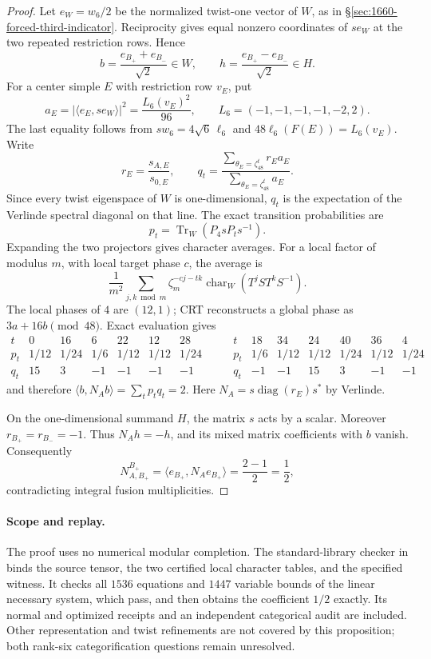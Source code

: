 \begin{proof}
Let $e_W=w_6/2$ be the normalized twist-one vector of $W$, as in
\S\ref{sec:1660-forced-third-indicator}. Reciprocity gives equal nonzero
coordinates of $se_W$ at the two repeated restriction rows. Hence
\[
 b=\frac{e_{B_+}+e_{B_-}}{\sqrt2}\in W,\qquad
 h=\frac{e_{B_+}-e_{B_-}}{\sqrt2}\in H.
\]
For a center simple $E$ with restriction row $v_E$, put
\[
 a_E=|\langle e_E,se_W\rangle|^2
     =\frac{L_6(v_E)^2}{96},\qquad
 L_6=(-1,-1,-1,-1,-2,2).
\]
The last equality follows from $sw_6=4\sqrt6\,\ell_6$ and
$48\ell_6(F(E))=L_6(v_E)$. Write
\[
 r_E=\frac{s_{A,E}}{s_{0,E}},\qquad
 q_t=\frac{\sum_{\theta_E=\zeta_{48}^t}r_Ea_E}
              {\sum_{\theta_E=\zeta_{48}^t}a_E}.
\]
Since every twist eigenspace of $W$ is one-dimensional, $q_t$ is the
expectation of the Verlinde spectral diagonal on that line. The exact
transition probabilities are
\[
 p_t=\operatorname{Tr}_W(P_4sP_ts^{-1}).
\]
Expanding the two projectors gives character averages. For a local
factor of modulus $m$, with local target phase $c$, the average is
\[
 \frac1{m^2}\sum_{j,k\bmod m}
 \zeta_m^{-cj-tk}\operatorname{char}_W(T^jST^kS^{-1}).
\]
The local phases of $4$ are $(12,1)$; CRT reconstructs a global phase
as $3a+16b\pmod {48}$. Exact evaluation gives
\[
\begin{array}{c|rrrrrr}
 t&0&16&6&22&12&28\\\hline
 p_t&1/12&1/24&1/6&1/12&1/12&1/24\\
 q_t&15&3&-1&-1&-1&-1
\end{array}
\qquad
\begin{array}{c|rrrrrr}
 t&18&34&24&40&36&4\\\hline
 p_t&1/6&1/12&1/12&1/24&1/12&1/24\\
 q_t&-1&-1&15&3&-1&-1
\end{array}
\]
and therefore $\langle b,N_A b\rangle=\sum_t p_tq_t=2$.
Here $N_A=s\operatorname{diag}(r_E)s^*$ by Verlinde.

On the one-dimensional summand $H$, the matrix $s$ acts by a scalar.
Moreover $r_{B_+}=r_{B_-}=-1$. Thus $N_Ah=-h$, and its mixed matrix
coefficients with $b$ vanish. Consequently
\[
 N_{A,B_+}^{B_+}=\langle e_{B_+},N_Ae_{B_+}\rangle
                =\frac{2-1}{2}=\frac12,
\]
contradicting integral fusion multiplicities.
\end{proof}

\paragraph{Scope and replay.}
The proof uses no numerical modular completion. The standard-library
checker in
binds the source tensor, the two certified local character tables, and
the specified witness. It checks all $1536$ equations
and $1447$ variable bounds of the linear necessary system, which
pass, and then obtains the coefficient $1/2$ exactly. Its normal and
optimized receipts and an independent categorical audit are included.
Other representation and twist refinements are not covered by this
proposition; both rank-six categorification questions remain unresolved.
